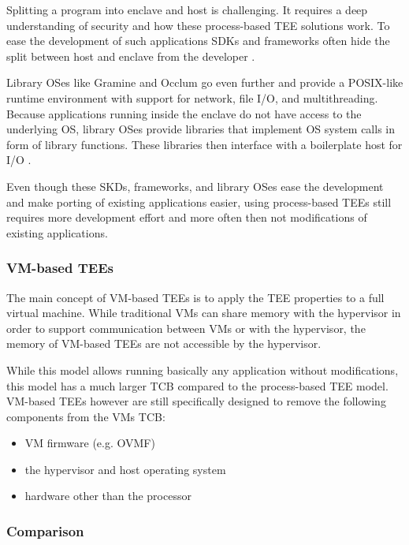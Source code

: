 Splitting a program into enclave and host is challenging. It requires a deep
understanding of security and how these process-based TEE solutions work. To
ease the development of such applications SDKs and frameworks often hide the
split between host and enclave from the developer \cite{schuster2022}.

Library OSes like Gramine and Occlum go even further and provide a POSIX-like
runtime environment with support for network, file I/O, and multithreading.
Because applications running inside the enclave do not have access to the
underlying OS, library OSes provide libraries that implement OS system calls in
form of library functions. These libraries then interface with a boilerplate
host for I/O \cite{tsai2014graphene}.

Even though these SKDs, frameworks, and library OSes ease the development and
make porting of existing applications easier, using process-based TEEs still
requires more development effort and more often then not modifications of
existing applications.

\subsubsection{VM-based TEEs}
\label{sec:vm-based-tees}

The main concept of VM-based TEEs is to apply the TEE properties to a full
virtual machine. While traditional VMs can share memory with the hypervisor in
order to support communication between VMs or with the hypervisor, the memory of
VM-based TEEs are not accessible by the hypervisor.

While this model allows running basically any application without modifications,
this model has a much larger TCB compared to the process-based TEE model.
VM-based TEEs however are still specifically designed to remove the following
components from the VMs TCB:

\begin{itemize}
  \item VM firmware (e.g. OVMF)
  \item the hypervisor and host operating system
  \item hardware other than the processor
\end{itemize}

\subsubsection{Comparison}

